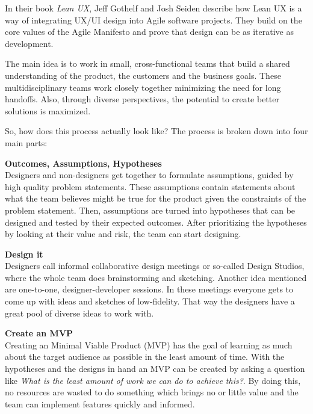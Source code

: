 In their book \textit{Lean UX}, Jeff Gothelf and Josh Seiden describe how Lean UX is a way of
integrating UX/UI design into Agile software projects. They build on the core values of the Agile
Manifesto and prove that design can be as iterative as development.

The main idea is to work in small, cross-functional teams that build a shared understanding of the
product, the customers and the business goals. These multidisciplinary teams work closely together
minimizing the need for long handoffs. Also, through diverse perspectives, the potential to create
better solutions is maximized. 

So, how does this process actually look like? The process is broken down into four main parts:


\textbf{Outcomes, Assumptions, Hypotheses} \\ %
Designers and non-designers get together to formulate assumptions, guided by high quality problem
statements. These assumptions contain statements about what the team believes might be true for the
product given the constraints of the problem statement. Then, assumptions are turned into hypotheses
that can be designed and tested by their expected outcomes. After prioritizing the hypotheses by
looking at their value and risk, the team can start designing.

\textbf{Design it} \\
Designers call informal collaborative design meetings or so-called Design Studios, where the whole
team does brainstorming and sketching. Another idea mentioned are one-to-one, designer-developer sessions.
In these meetings everyone gets to come up with ideas and sketches of low-fidelity. That way the
designers have a great pool of diverse ideas to work with.

\textbf{Create an MVP} \\
Creating an Minimal Viable Product (MVP) has the goal of learning as much about the target audience
as possible in the least amount of time. With the hypotheses and the designs in hand an MVP can be
created by asking a question like \textit{What is the least amount of work we can do to achieve
    this?}. By doing this, no resources are wasted to do something which brings no or little value and
the team can implement features quickly and informed.

